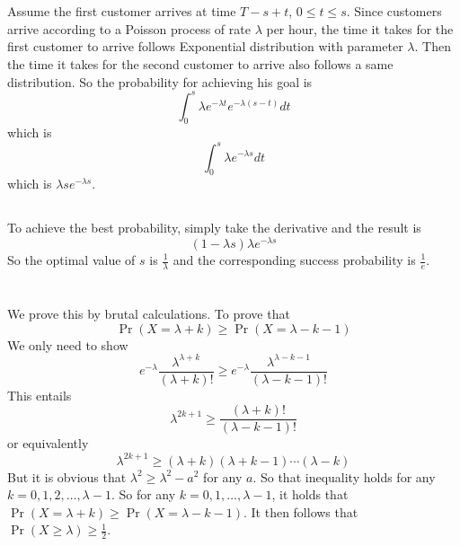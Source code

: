 \documentclass[12pt,letterpaper]{article}
\begin{document}
\section{}
\subsection{}
Assume the first customer arrives at time $T-s+t$, $0 \leq t\leq s$.
Since customers arrive according to a Poisson process of rate $\lambda$ per hour,
the time it takes for the first customer to arrive follows Exponential distribution with parameter $\lambda$.
Then the time it takes for the second customer to arrive also follows a same distribution.
So the probability for achieving his goal is 
$$\int_{0}^{s}\lambda e^{-\lambda t}e^{-\lambda(s-t)}dt$$
which is 
$$\int_{0}^{s}\lambda e^{-\lambda s}dt$$
which is $\lambda se^{-\lambda s}$.
\subsection{}
To achieve the best probability, 
simply take the derivative and the result is 
$$(1-\lambda s)\lambda e^{-\lambda s}$$
So the optimal value of $s$ is $\frac{1}{\lambda}$ 
and the corresponding success probability is $\frac{1}{e}$.

\section{}
\subsection{}
We prove this by brutal calculations.\newline
To prove that $$\Pr(X=\lambda +k)\geq \Pr(X=\lambda -k-1)$$
We only need to show 
$$e^{-\lambda}\frac{\lambda^{\lambda+k}}{(\lambda +k)!}\geq e^{-\lambda}\frac{\lambda^{\lambda-k-1}}{(\lambda -k-1)!}$$
This entails
$$\lambda^{2k+1}\geq \frac{(\lambda +k)!}{(\lambda-k-1)!}$$
or equivalently 
$$\lambda^{2k+1}\geq (\lambda+k)(\lambda+k-1)\cdots (\lambda -k)$$
But it is obvious that $\lambda^2\geq \lambda^2 -a^2$ for any $a$.
So that inequality holds for any $k=0,1,2,\dots,\lambda-1$.
So for any $k=0,1,\dots,\lambda-1$,
it holds that $\Pr(X=\lambda +k)\geq \Pr(X=\lambda -k-1)$.
It then follows that $\Pr(X\geq\lambda)\geq \frac{1}{2}$.
\end{document}
